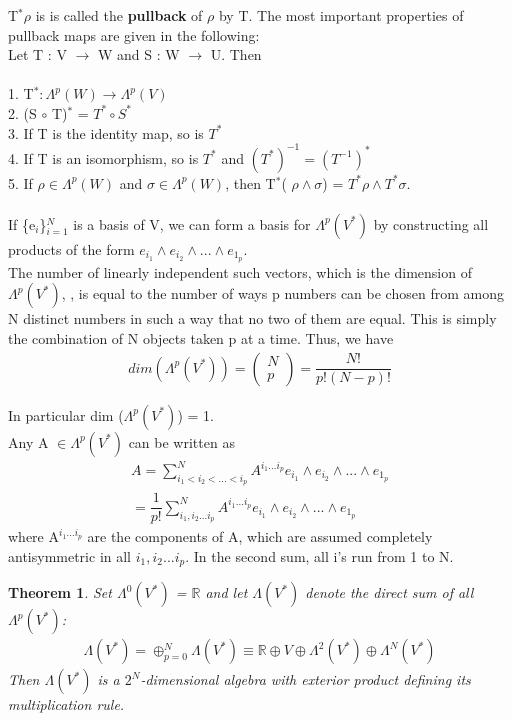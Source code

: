 \documentclass[12pt,a4paper]{article}
\newtheorem{thm}{Theorem}
\begin{document}
T$^*\rho$ is is called the \textbf{pullback } of $\rho$ by T. The most important properties of
pullback maps are given in the following:\\
Let T : V $\to$ W and  S : W $\to$ U. Then\\
\\
1. T$^* : \Lambda^{p} (W) \to \Lambda^{p} (V)$\\
2. (S $\circ$ T)$^*$ = $T^* \circ S^*$\\
3. If T is the identity map, so is $T^*$\\
4. If T is an isomorphism, so is $T^*$ and $(T^*)^{-1} = (T^{-1})^*$\\
5. If $\rho \in \Lambda^{p} (W)$ and $\sigma \in \Lambda^{p} (W)$, then T$^*$( $\rho \wedge \sigma $) = $T^* \rho \wedge T^* \sigma$.
\\ \\
If \{e$_i$\}$^N_{i=1}$ is a basis of V, we can form a basis for $\Lambda^{p}(V^*)$ by constructing all products of the form $e_{i_1} \wedge e_{i_2} \wedge ... \wedge e_{1_p}$.  \\The number of linearly independent such vectors, which is the dimension of  $\Lambda^{p}(V^*)$,  , is equal to the number
of ways p numbers can be chosen from among N distinct numbers in such
a way that no two of them are equal. This is simply the combination of N
objects taken p at a time. Thus, we have \\
\begin{eqnarray*}
 dim (\Lambda^{p}(V^*)) =  \begin{pmatrix} N \\ p \end{pmatrix} = \dfrac{N!}{p!(N - p)!}
\end{eqnarray*}

In particular dim ($\Lambda^{p}(V^*)$) = 1.\\
\indent Any A $\in \Lambda^{p}(V^*)$ can be written as 
\begin{eqnarray*}
A = \sum^{N}_{i_1 < i_2 < ... < i_p} A^{i_1...i_p}  e_{i_1} \wedge e_{i_2} \wedge ... \wedge e_{1_p} \\
= \dfrac{1}{p!} \sum^{N}_{i_1,i_2 ... i_p} A^{i_1...i_p}  e_{i_1} \wedge e_{i_2} \wedge ... \wedge e_{1_p}
\end{eqnarray*}
where A$^{i_1...i_p}$ are the components of A, which are assumed completely antisymmetric in all $i_1,i_2 ... i_p$. In the second sum, all i’s run from 1 to N.\\
\begin{thm}
Set $\Lambda^{0}(V^*)$ = $\mathbb{R}$ and let $\Lambda(V^*)$ denote the direct
sum of all  $\Lambda^{p}(V^*)$:
\begin{eqnarray*}
\Lambda(V^*)  = \oplus^{N}_{p = 0}  \Lambda(V^*) \equiv \mathbb{R} \oplus V \oplus \Lambda^{2}(V^*) \oplus \Lambda^{N}(V^*)
\end{eqnarray*}
Then $\Lambda(V^*)$ is a $2^N$-dimensional algebra with exterior product defining its multiplication rule.	
\end{thm}
\end{document}
